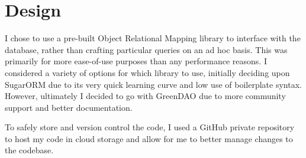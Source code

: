 \chapter{Design}

I chose to use a pre-built Object Relational Mapping library to interface with the database, rather than crafting particular queries on an ad hoc basis.
This was primarily for more ease-of-use purposes than any performance reasons. 
I considered a variety of options for which library to use, initially deciding upon SugarORM due to its very quick learning curve and low use of boilerplate syntax. 
However, ultimately I decided to go with GreenDAO due to more community support and better documentation.

To safely store and version control the code, I used a GitHub private repository to host my code in cloud storage and allow for me to better manage changes to the codebase.